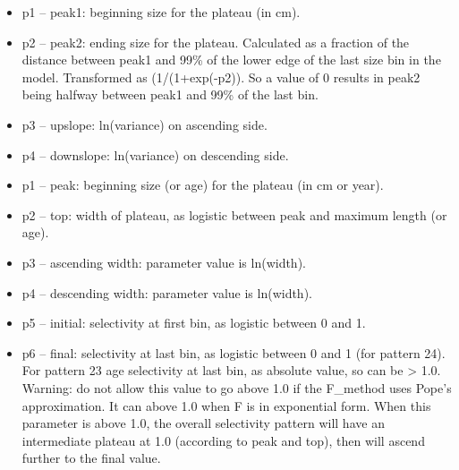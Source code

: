 	\begin{itemize}
		\item p1 – peak1: beginning size for the plateau (in cm).
		\item p2 – peak2: ending size for the plateau.  Calculated as a fraction of the distance between peak1 and 99\% of the lower edge of the last size bin in the model.  Transformed as (1/(1+exp(-p2)). So a value of 0 results in peak2 being halfway between peak1 and 99\% of the last bin.
		\item p3 – upslope: ln(variance) on ascending side.
		\item p4 – downslope:  ln(variance) on descending side.
	\end{itemize}

	\begin{itemize}
		\item p1 – peak: beginning size (or age) for the plateau (in cm or year).
		\item p2 – top: width of plateau, as logistic between peak and maximum length (or age).
		\item p3 – ascending width:  parameter value is ln(width).
		\item p4 – descending width:  parameter value is ln(width).
		\item p5 – initial: selectivity at first bin, as logistic between 0 and 1.
		\item p6 – final: selectivity at last bin, as logistic between 0 and 1 (for pattern 24). For pattern 23 age selectivity at last bin, as absolute value, so can be > 1.0. Warning: do not allow this value to go above 1.0 if the F\_method uses Pope’s approximation. It can above 1.0 when F is in exponential form.  When this parameter is above 1.0, the overall selectivity pattern will have an intermediate plateau at 1.0 (according to peak and top), then will ascend further to the final value.
	\end{itemize}
	
